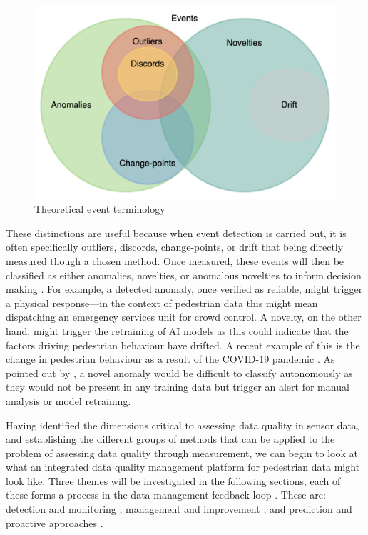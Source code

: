 \begin{figure}[ht]
    \centering
    \includegraphics{figures/literature_review/theoretical_event_terminology.png}
    \caption{Theoretical event terminology}
    \label{fig:theoretical_event_terminology}
\end{figure}

These distinctions are useful because when event detection is carried out, it is often specifically outliers, discords, change-points, or drift that being directly measured though a chosen method. Once measured, these events will then be classified as either anomalies, novelties, or anomalous novelties to inform decision making \citep{abualsheikhMarkovDecisionProcesses2015}. For example, a detected anomaly, once verified as reliable, might trigger a physical response---in the context of pedestrian data this might mean dispatching an emergency services unit for crowd control. A novelty, on the other hand, might trigger the retraining of AI models as this could indicate that the factors driving pedestrian behaviour have drifted. A recent example of this is the change in pedestrian behaviour as a result of the COVID-19 pandemic \citep{chenEstimatingVehiclePedestrian2021}. As pointed out by \cite{carrenoAnalyzingRareEvent2020}, a novel anomaly would be difficult to classify autonomously as they would not be present in any training data but trigger an alert for manual analysis or model retraining.


Having identified the dimensions critical to assessing data quality in sensor data, and establishing the different groups of methods that can be applied to the problem of assessing data quality through measurement, we can begin to look at what an integrated data quality management platform for pedestrian data might look like. Three themes will be investigated in the following sections, each of these forms a process in the data management feedback loop \citep{immonenEvaluatingQualitySocial2015,ehrlingerAutomatedDataQuality2017}. These are: detection and monitoring \citep{woodallDataQualityAssessment2013,ehrlingerAutomatedDataQuality2017}; management and improvement \citep{khatriDesigningDataGovernance2010, batiniDataInformationQuality2016}; and prediction and proactive approaches \citep{liDataQualityObservation2012,ardagnaContextawareDataQuality2018}.


